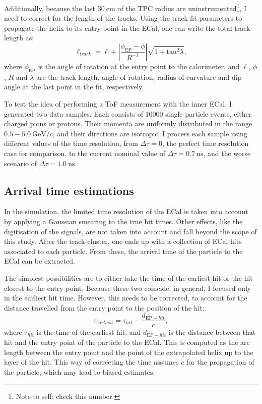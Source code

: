 Additionally, because the last $30~\mathrm{cm}$ of the TPC radius are uninstrumented\footnote{Note to self: check this number.}, I need to correct for the length of the tracks. Using the track fit parameters to propagate the helix to its entry point in the ECal, one can write the total track length as:
\begin{equation}
	\ell_{track} = \ell + \left| \frac{\phi_{\mathrm{EP}} - \phi}{R^{-1}} \right| \sqrt{1+\mathrm{tan}^{2}\lambda},
\end{equation}
where $\phi_{\mathrm{EP}}$ is the angle of rotation at the entry point to the calorimeter, and $\ell$, $\phi$, $R$ and $\lambda$ are the track length, angle of rotation, radius of curvature and dip angle at the last point in the fit, respectively.

To test the idea of performing a ToF measurement with the inner ECal, I generated two data samples. Each consists of 10000 single particle events, either charged pions or protons. Their momenta are uniformly distributed in the range $0.5-5.0~\mathrm{GeV}/c$, and their directions are isotropic. I process each sample using different values of the time resolution, from $\Delta \tau = 0$, the perfect time resolution case for comparison, to the current nominal value of $\Delta \tau = 0.7~\mathrm{ns}$, and the worse scenario of $\Delta \tau = 1.0~\mathrm{ns}$.

\subsection{Arrival time estimations}

In the simulation, the limited time resolution of the ECal is taken into account by applying a Gaussian smearing to the true hit times. Other effects, like the digitisation of the signals, are not taken into account and fall beyond the scope of this study. After the track-cluster, one ends up with a collection of ECal hits associated to each particle. From these, the arrival time of the particle to the ECal can be extracted.

The simplest possibilities are to either take the time of the earliest hit or the hit closest to the entry point. Because these two coincide, in general, I focused only in the earliest hit time. However, this needs to be corrected, to account for the distance travelled from the entry point to the position of the hit:
\begin{equation}\label{8.22}
	\tau_{earliest} = \tau_{hit} - \frac{d_{\mathrm{EP}-hit}}{c},
\end{equation}
where $\tau_{hit}$ is the time of the earliest hit, and $d_{\mathrm{EP}-hit}$ is the distance between that hit and the entry point of the particle to the ECal. This is computed as the arc length between the entry point and the point of the extrapolated helix up to the layer of the hit. This way of correcting the time assumes $c$ for the propagation of the particle, which may lead to biased estimates.

